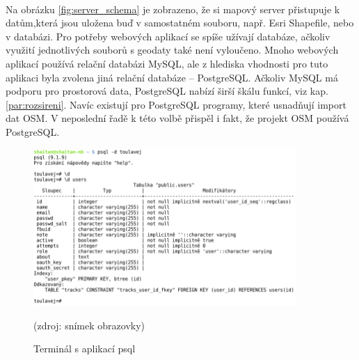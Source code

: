 \documentclass[11pt,a4paper,titlepage,oneside]{book}
\begin{document}
		\paragraph{} Na obrázku \ref{fig:server_schema} je zobrazeno, že si mapový server přistupuje k datům,která jsou uložena buď v samostatném souboru, např. Esri Shapefile, nebo v databázi. Pro potřeby webových aplikací se spíše užívají databáze, ačkoliv využití jednotlivých souborů s geodaty také není vyloučeno. Mnoho webových aplikací používá relační databázi MySQL, ale z hlediska vhodnosti pro tuto aplikaci byla zvolena jiná relační databáze -- PostgreSQL. Ačkoliv MySQL má podporu pro prostorová data, PostgreSQL nabízí širší škálu funkcí, viz kap. \ref{par:rozsireni}. Navíc existují pro PostgreSQL programy, které usnadňují import dat \ac{OSM}. V neposlední řadě k této volbě přispěl i fakt, že projekt \ac{OSM} používá PostgreSQL.
		\begin{figure}[!h]
			\begin{center}
				\includegraphics[width=10cm]{obrazky/psql.png}
				\caption{Terminál s aplikací psql}
				\label{fig:psql}
				(zdroj: snímek obrazovky)
			\end{center}
		\end{figure}



\end{document}
